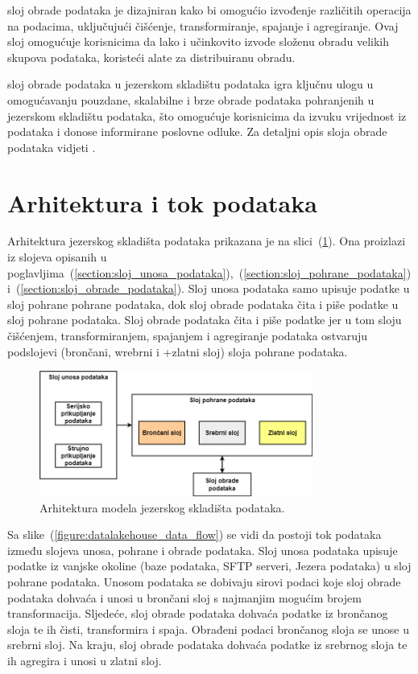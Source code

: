 sloj obrade podataka je dizajniran kako bi omogućio izvođenje različitih
operacija na podacima, uključujući čišćenje, transformiranje, spajanje i
agregiranje. Ovaj sloj omogućuje korisnicima da lako i učinkovito izvode složenu
obradu velikih skupova podataka, koristeći alate za distribuiranu obradu.

sloj obrade podataka u jezerskom skladištu podataka igra ključnu ulogu u
omogućavanju pouzdane, skalabilne i brze obrade podataka pohranjenih u jezerskom
skladištu podataka, što omogućuje korisnicima da izvuku vrijednost iz podataka i
donose informirane poslovne odluke. Za detaljni opis sloja obrade podataka
vidjeti \cite{datalakehouse2022}.

\section{Arhitektura i tok podataka} \label{section:arhitektura_i_tok_podataka}

Arhitektura jezerskog skladišta podataka prikazana je na
slici~(\ref{figure:datalakehouse_architecture}). Ona proizlazi iz slojeva opisanih
u
poglavljima~(\ref{section:sloj_unosa_podataka}),~(\ref{section:sloj_pohrane_podataka})
i~(\ref{section:sloj_obrade_podataka}). Sloj unosa podataka samo upisuje podatke
u sloj pohrane pohrane podataka, dok sloj obrade podataka čita i piše podatke u
sloj pohrane podataka. Sloj obrade podataka čita i piše podatke jer u tom sloju
čišćenjem, transformiranjem, spajanjem i agregiranje podataka ostvaruju
podslojevi (brončani, wrebrni i +zlatni sloj) sloja pohrane podataka.

\begin{figure}[htb]
    \centering
    \includegraphics[width=0.8\textwidth]{images/arhitektura.drawio.png}
    \caption{Arhitektura modela jezerskog skladišta podataka.}
    \label{figure:datalakehouse_architecture}
\end{figure}

Sa slike~(\ref{figure:datalakehouse_data_flow}) se vidi da postoji tok podataka
između slojeva unosa, pohrane i obrade podataka. Sloj unosa podataka upisuje
podatke iz vanjske okoline (baze podataka, SFTP serveri, Jezera podataka) u sloj
pohrane podataka. Unosom podataka se dobivaju sirovi podaci koje sloj obrade
podataka dohvaća i unosi u brončani sloj s najmanjim mogućim brojem
transformacija. Sljedeće, sloj obrade podataka dohvaća podatke iz brončanog
sloja te ih čisti, transformira i spaja. Obrađeni podaci brončanog sloja se
unose u srebrni sloj. Na kraju, sloj obrade podataka dohvaća podatke iz srebrnog
sloja te ih agregira i unosi u zlatni sloj. 

